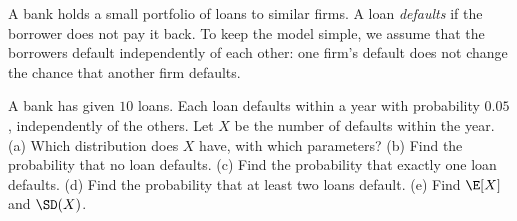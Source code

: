 
\begin{problem}
	\begin{context}
		A bank holds a small portfolio of loans to similar firms. A loan
		\emph{defaults} if the borrower does not pay it back. To keep the model
		simple, we assume that the borrowers default independently of each
		other: one firm's default does not change the chance that another firm
		defaults.
	\end{context}
	A bank has given $10$ loans. Each loan defaults within a year with
	probability $0.05$, independently of the others. Let $X$ be the number of
	defaults within the year.
	(a) Which distribution does $X$ have, with which parameters?
	(b) Find the probability that no loan defaults.
	(c) Find the probability that exactly one loan defaults.
	(d) Find the probability that at least two loans default.
	(e) Find $\E[X]$ and $\SD(X)$.
\end{problem}

